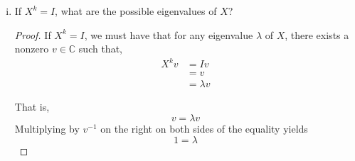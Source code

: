 \documentclass[11pt, reqno]{amsart}
\theoremstyle{plain}
\theoremstyle{definition}
\theoremstyle{example}
\begin{document}
\begin{enumerate}[1.]
\begin{enumerate}[(i)]
\begin{proof}
Proceeding inductively, we get, $$X^kv = \lambda^kv$$ Hence, $\lambda^k$ is an eigenvalue of $X^k$. Now suppose there exists an eigenvalue $\alpha$ of $X^k$ which is not in the set $\{\lambda^k ~|~ \lambda \in \Lambda\}$. 
\end{proof}
\item If $X^k = I$, what are the possible eigenvalues of $X$?
\begin{proof}
If $X^k = I$, we must have that for any eigenvalue $\lambda$ of $X$, there exists a nonzero $v \in \mathbb{C}$ such that,
\begin{align*}
X^kv &= Iv\\
&= v\\
&= \lambda v
\end{align*}

That is, $$v = \lambda v$$ Multiplying by $v^{-1}$ on the right on both sides of the equality yields $$1 = \lambda$$


\end{proof}
\end{enumerate}
\end{enumerate}
\end{document}
